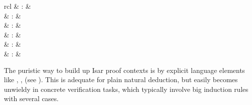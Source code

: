 \begin{isabellebody}
\begin{isamarkuptext}
\begin{descr}
  \end{descr}%
\end{isamarkuptext}%
\isamarkuptrue%
%
\isamarkuptrue%
%
\isamarkuptrue%
%
\begin{isamarkuptext}%
\begin{matharray}{rcl}
    \hypertarget{command.case}{\hyperlink{command.case}{\mbox{}}} & : &  \\
    \hypertarget{command.print_cases}{\hyperlink{command.print_cases}{\mbox{}}}\isa{{\isachardoublequote}\isactrlsup {\isacharasterisk}{\isachardoublequote}} & : &  \\
    \hypertarget{attribute.case_names}{\hyperlink{attribute.case_names}{\mbox{}}} & : & \isaratt \\
    \hypertarget{attribute.case_conclusion}{\hyperlink{attribute.case_conclusion}{\mbox{}}} & : & \isaratt \\
    \hypertarget{attribute.params}{\hyperlink{attribute.params}{\mbox{}}} & : & \isaratt \\
    \hypertarget{attribute.consumes}{\hyperlink{attribute.consumes}{\mbox{}}} & : & \isaratt \\
  \end{matharray}

  The puristic way to build up Isar proof contexts is by explicit
  language elements like \hyperlink{command.fix}{\mbox{}}, \hyperlink{command.assume}{\mbox{}},
  \hyperlink{command.let}{\mbox{}} (see ).  This is adequate
  for plain natural deduction, but easily becomes unwieldy in concrete
  verification tasks, which typically involve big induction rules with
  several cases.


\end{isamarkuptext}
\end{isabellebody}
